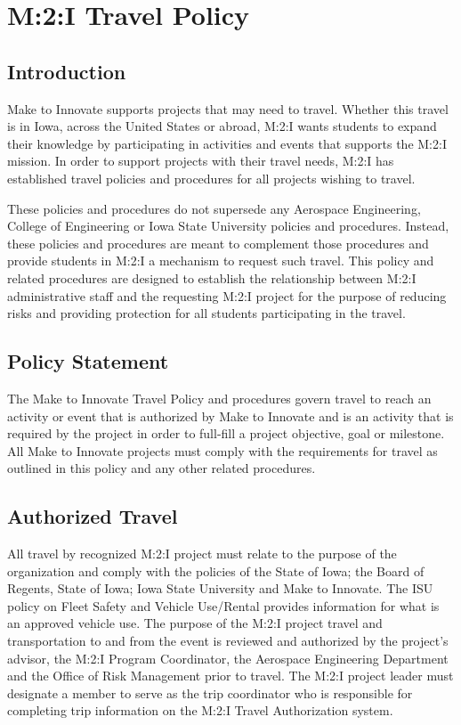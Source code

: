 \chapter{M:2:I Travel Policy}

\section{Introduction}
Make to Innovate supports projects that may need to travel.  Whether this travel is in Iowa, across the United States or abroad, M:2:I wants students to expand their knowledge by participating in activities and events that supports the M:2:I mission.  In order to support projects with their travel needs, M:2:I has established travel policies and procedures for all projects wishing to travel.  

These policies and procedures do not supersede any Aerospace Engineering, College of Engineering or Iowa State University policies and procedures.  Instead, these policies and procedures are meant to complement those procedures and provide students in M:2:I a mechanism to request such travel.  This policy and related procedures are designed to establish the relationship between M:2:I administrative staff and the requesting M:2:I project for the purpose of reducing risks and providing protection for all students participating in the travel.

\section{Policy Statement}
The Make to Innovate Travel Policy and procedures govern travel to reach an activity or event that is authorized by Make to Innovate and is an activity that is required by the project in order to full-fill a project objective, goal or milestone.  All Make to Innovate projects must comply with the requirements for travel as outlined in this policy and any other related procedures.

\section{Authorized Travel}
All travel by recognized M:2:I project must relate to the purpose of the organization and comply with the policies of the State of Iowa; the Board of Regents, State of Iowa; Iowa State University and Make to Innovate.  The ISU policy on Fleet Safety and Vehicle Use/Rental provides information for what is an approved vehicle use.  The purpose of the M:2:I project travel and transportation to and from the event is reviewed and authorized by the project's advisor, the M:2:I Program Coordinator, the Aerospace Engineering Department and the Office of Risk Management prior to travel. The M:2:I project leader must designate a member to serve as the trip coordinator who is responsible for completing trip information on the M:2:I Travel Authorization system.

